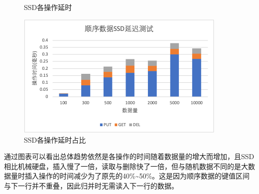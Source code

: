\documentclass[fontset=windows]{article}
\begin{document}
\begin{enumerate}
\begin{figure}[H]
\begin{minipage}[t]{0.5\linewidth}
     \caption{SSD各操作延时}   
     \label{fig:s_S_l_t}
   \end{minipage}
   \begin{minipage}[t]{0.5\linewidth} %
     \centering
     \includegraphics[width=0.9\textwidth]{img/sequential_SSD_latency_one.png}
     \caption{SSD各操作延时占比}
     \label{fig:s_S_l_o}
    \end{minipage}
\end{figure}
通过图表可以看出总体趋势依然是各操作的时间随着数据量的增大而增加，且SSD相比机械硬盘，插入慢了一倍，读取与删除快了一倍，但与随机数据不同的是大数据量时插入操作的时间减少为了原先的40\%\textasciitilde 50\%。这是因为顺序数据的键值区间与下一行并不重叠，因此归并时无需读入下一行的数据。
\end{enumerate}
\end{document}
